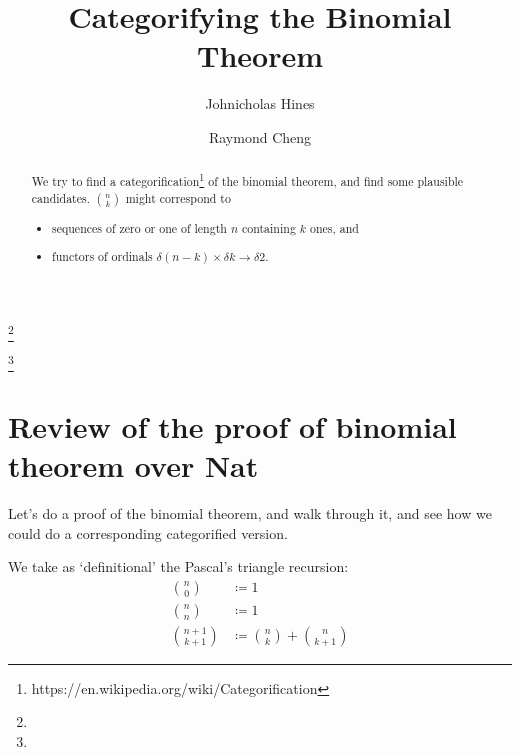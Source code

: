 \documentclass{proc-l}
\theoremstyle{definition}
\theoremstyle{remark}
\numberwithin{equation}{section}
\begin{document}
\title[Categorifying the Binomial Theorem]{Categorifying the Binomial Theorem}


\author{Johnicholas Hines}
\address{}
\curraddr{}
\email{}
\thanks{}

\author{Raymond Cheng}
\address{}
\curraddr{}
\email{}
\thanks{}


\date{}

\dedicatory{}

\commby{}

\begin{abstract}
We try to find a categorification\footnote{https://en.wikipedia.org/wiki/Categorification} of the binomial theorem,
and find some plausible candidates. \({n \choose k}\) might correspond to
\begin{itemize}
    \item sequences of zero or one of length \(n\) containing \(k\) ones, and
    \item functors of ordinals \(\delta (n-k) \times \delta k \to \delta 2\).
\end{itemize} 
\end{abstract}

\maketitle

\section{Review of the proof of binomial theorem over Nat}

Let's do a proof of the binomial theorem, and walk through it,
and see how we could do a corresponding categorified version.

We take as `definitional' the Pascal's triangle recursion:
\begin{align*}
{n \choose 0} & \coloneqq 1 \\
{n \choose n} & \coloneqq 1 \\
{n + 1 \choose k + 1} & \coloneqq {n \choose k} + {n \choose k+1}
\end{align*}
\end{document}
